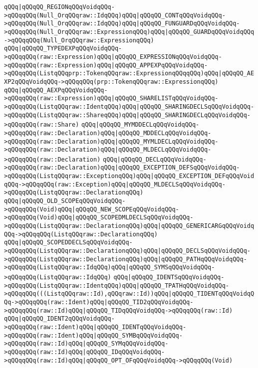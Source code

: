 \verb|qQQq|\verb#|qQQqQQ_REGIONqQQqVoidqQQq->qQQqqQQq(Null_OrqQQqraw::IdqQQq)qQQq|qQQqQQ_CONTqQQqVoidqQQq->qQQqqQQq(Null_OrqQQqraw::IdqQQq)qQQq|qQQqQQ_FUNGUARDqQQqVoidqQQq->qQQqqQQq(Null_OrqQQqraw::ExpressionqQQq)qQQq|qQQqQQ_GUARDqQQqVoidqQQq->qQQqqQQq(Null_OrqQQqraw::ExpressionqQQq)#\newline
\verb|qQQq|\verb#|qQQqQQ_TYPEDEXPqQQqVoidqQQq->qQQqqQQq(raw::Expression)qQQq|qQQqQQ_EXPRESSIONqQQqVoidqQQq->qQQqqQQq(raw::Expression)qQQq|qQQqQQ_APPEXPqQQqVoidqQQq->qQQqqQQq(ListqQQqprp::TokenqQQqraw::ExpressionqQQqqQQq)qQQq|qQQqQQ_AEXP2qQQqVoidqQQq->qQQqqQQq(prp::TokenqQQqraw::ExpressionqQQq)#\newline
\verb|qQQq|\verb#|qQQqQQ_AEXPqQQqVoidqQQq->qQQqqQQq(raw::Expression)qQQq|qQQqQQ_SHARELISTqQQqVoidqQQq->qQQqqQQq(ListqQQqraw::IdentqQQq)qQQq|qQQqQQ_SHARINGDECLSqQQqVoidqQQq->qQQqqQQq(ListqQQqraw::ShareqQQq)qQQq|qQQqQQ_SHARINGDECLqQQqVoidqQQq->qQQqqQQq(raw::Share)#\newline
\verb|qQQq|\verb#|qQQqQQ_MYMDDECLqQQqVoidqQQq->qQQqqQQq(raw::Declaration)qQQq|qQQqQQ_MDDECLqQQqVoidqQQq->qQQqqQQq(raw::Declaration)qQQq|qQQqQQ_MYMLDECLqQQqVoidqQQq->qQQqqQQq(raw::Declaration)qQQq|qQQqQQ_MLDECLqQQqVoidqQQq->qQQqqQQq(raw::Declaration)#\newline
\verb|qQQq|\verb#|qQQqQQ_DECLqQQqVoidqQQq->qQQqqQQq(raw::Declaration)qQQq|qQQqQQ_EXCEPTION_DEFSqQQqVoidqQQq->qQQqqQQq(ListqQQqraw::ExceptionqQQq)qQQq|qQQqQQ_EXCEPTION_DEFqQQqVoidqQQq->qQQqqQQq(raw::Exception)qQQq|qQQqQQ_MLDECLSqQQqVoidqQQq->qQQqqQQq(ListqQQqraw::DeclarationqQQq)#\newline
\verb|qQQq|\verb#|qQQqQQ_OLD_SCOPEqQQqVoidqQQq->qQQqqQQq(Void)qQQq|qQQqQQ_NEW_SCOPEqQQqVoidqQQq->qQQqqQQq(Void)qQQq|qQQqQQ_SCOPEDMLDECLSqQQqVoidqQQq->qQQqqQQq(ListqQQqraw::DeclarationqQQq)qQQq|qQQqQQ_GENERICARGqQQqVoidqQQq->qQQqqQQq(ListqQQqraw::DeclarationqQQq)#\newline
\verb|qQQq|\verb#|qQQqQQ_SCOPEDDECLSqQQqVoidqQQq->qQQqqQQq(ListqQQqraw::DeclarationqQQq)qQQq|qQQqQQ_DECLSqQQqVoidqQQq->qQQqqQQq(ListqQQqraw::DeclarationqQQq)qQQq|qQQqQQ_PATHqQQqVoidqQQq->qQQqqQQq(ListqQQqraw::IdqQQq)qQQq|qQQqQQ_SYMSqQQqVoidqQQq->qQQqqQQq(ListqQQqraw::IdqQQq)#\newline
\verb|qQQq|\verb#|qQQqQQ_IDENTSqQQqVoidqQQq->qQQqqQQq(ListqQQqraw::IdentqQQq)qQQq|qQQqQQ_TPATHqQQqVoidqQQq->qQQqqQQq(((ListqQQqraw::Id),qQQqraw::Id))qQQq|qQQqQQ_TIDENTqQQqVoidqQQq->qQQqqQQq(raw::Ident)qQQq|qQQqQQ_TID2qQQqVoidqQQq->qQQqqQQq(raw::Id)qQQq|qQQqQQ_TIDqQQqVoidqQQq->qQQqqQQq(raw::Id)#\newline
\verb|qQQq|\verb#|qQQqQQ_IDENT2qQQqVoidqQQq->qQQqqQQq(raw::Ident)qQQq|qQQqQQ_IDENTqQQqVoidqQQq->qQQqqQQq(raw::Ident)qQQq|qQQqQQ_SYMBqQQqVoidqQQq->qQQqqQQq(raw::Id)qQQq|qQQqQQ_SYMqQQqVoidqQQq->qQQqqQQq(raw::Id)qQQq|qQQqQQ_IDqQQqVoidqQQq->qQQqqQQq(raw::Id)qQQq|qQQqQQ_OPT_OFqQQqVoidqQQq->qQQqqQQq(Void)#\newline
